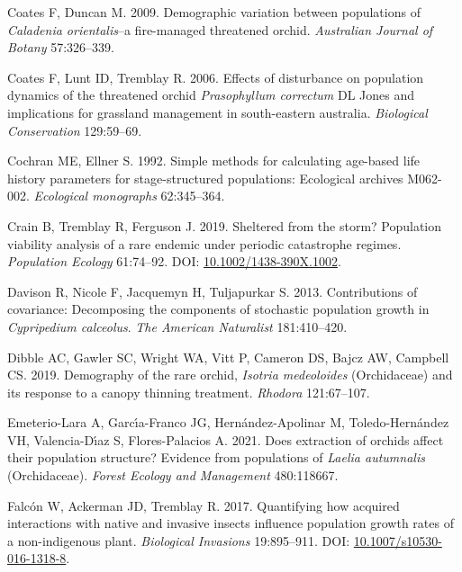 \documentclass[
  12pt,
  letterpaper,
]{book}
\newlength{\cslhangindent}
\newenvironment{CSLReferences}[2] %
 {\begin{list}{}{%
  \setlength{\itemindent}{0pt}
  \setlength{\leftmargin}{0pt}
  \setlength{\parsep}{0pt}
  \ifodd #1
   \setlength{\leftmargin}{\cslhangindent}
   \setlength{\itemindent}{-1\cslhangindent}
  \fi
  \setlength{\itemsep}{#2\baselineskip}}}
 {\end{list}}
\begin{document}
\begin{CSLReferences}{1}{0}
Coates F, Duncan M. 2009. Demographic variation between populations of
\emph{{C}aladenia {o}rientalis}--a fire-managed threatened orchid.
\emph{Australian Journal of Botany} 57:326--339.

Coates F, Lunt ID, Tremblay R. 2006. Effects of disturbance on
population dynamics of the threatened orchid \emph{{P}rasophyllum
{c}orrectum} {DL} {J}ones and implications for grassland management in
south-eastern australia. \emph{Biological Conservation} 129:59--69.

Cochran ME, Ellner S. 1992. Simple methods for calculating age-based
life history parameters for stage-structured populations: Ecological
archives M062-002. \emph{Ecological monographs} 62:345--364.

Crain B, Tremblay R, Ferguson J. 2019. Sheltered from the storm?
Population viability analysis of a rare endemic under periodic
catastrophe regimes. \emph{Population Ecology} 61:74--92. DOI:
\href{https://doi.org/10.1002/1438-390X.1002}{10.1002/1438-390X.1002}.

Davison R, Nicole F, Jacquemyn H, Tuljapurkar S. 2013. Contributions of
covariance: Decomposing the components of stochastic population growth
in \emph{{C}ypripedium {c}alceolus}. \emph{The American Naturalist}
181:410--420.

Dibble AC, Gawler SC, Wright WA, Vitt P, Cameron DS, Bajcz AW, Campbell
CS. 2019. Demography of the rare orchid, \emph{{I}sotria {m}edeoloides}
({O}rchidaceae) and its response to a canopy thinning treatment.
\emph{Rhodora} 121:67--107.

Emeterio-Lara A, Garcı́a-Franco JG, Hernández-Apolinar M,
Toledo-Hernández VH, Valencia-Dı́az S, Flores-Palacios A. 2021. Does
extraction of orchids affect their population structure? Evidence from
populations of \emph{{L}aelia {a}utumnalis} ({O}rchidaceae).
\emph{Forest Ecology and Management} 480:118667.

Falcón W, Ackerman JD, Tremblay R. 2017. Quantifying how acquired
interactions with native and invasive insects influence population
growth rates of a non-indigenous plant. \emph{Biological Invasions}
19:895--911. DOI:
\href{https://doi.org/10.1007/s10530-016-1318-8}{10.1007/s10530-016-1318-8}.


\end{CSLReferences}
\end{document}
